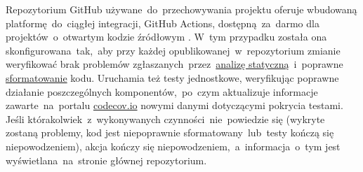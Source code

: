 Repozytorium GitHub używane~do~przechowywania projektu oferuje wbudowaną platformę~do~ciągłej integracji, GitHub Actions, dostępną~za~darmo dla projektów~o~otwartym kodzie źródłowym \cite{RoundSpot_Actions}. W~tym przypadku została ona skonfigurowana~tak,~aby przy każdej opublikowanej~w~repozytorium zmianie weryfikować brak problemów zgłaszanych~przez~\hyperref[par:static_analysis]{analizę statyczną}~i~poprawne \hyperref[par:dart_format]{sformatowanie} kodu. Uruchamia też testy jednostkowe, weryfikując poprawne działanie poszczególnych komponentów,~po~czym aktualizuje informacje zawarte~na~portalu \href{https://codecov.io/}{codecov.io} \cite{RS_Coverage} nowymi danymi dotyczącymi pokrycia testami. Jeśli którakolwiek~z~wykonywanych czynności~nie~powiedzie się (wykryte zostaną problemy, kod jest niepoprawnie sformatowany~lub~testy kończą się niepowodzeniem), akcja kończy się niepowodzeniem,~a~informacja~o~tym jest wyświetlana~na~stronie głównej repozytorium.
